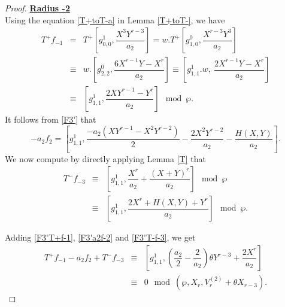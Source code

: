 \documentclass[11pt, reqno]{amsart}
\numberwithin{equation}{section}
\theoremstyle{definition}
\theoremstyle{remark}
\theoremstyle{definition}
\theoremstyle{remark}
\theoremstyle{remark}
\begin{document}
\begin{proof}
 
\noindent\underline{\textbf{Radius -2}}\\ 
Using the equation \eqref{T+toT-a} in Lemma \ref{T+toT-}, we have
\begin{eqnarray}
T^{+}f_{-1} &=& T^{+}\left[g_{0,0}^{1}, \dfrac{X^{3}Y^{r-3}}{a_{2}}\right] =  w.T^{+}\left[g_{1,0}^{0}, \dfrac{X^{r-3}Y^{3}}{a_{2}}\right] \nonumber\\
&\equiv& w.\left[g_{2,2}^{0}, \dfrac{6X^{r-1}Y-X^{r}}{a_{2}}\right]\equiv \left[g_{1,1}^{1}.w,\:\dfrac{2X^{r-1}Y-X^{r}}{a_{2}}\right] \nonumber\\
&\equiv& \left[g_{1,1}^{1}, \dfrac{2XY^{r-1}-Y^{r}}{a_{2}}\right] \mod\wp.\label{F3'T+f-1}
\end{eqnarray}
It follows from \eqref{F3'} that
\begin{equation}\label{F3'a2f-2}
    -a_{2}f_{2} = \left[g_{1,1}^{1},  \dfrac{-a_{2}(XY^{r-1}-X^{2}Y^{r-2})}{2}-\dfrac{2X^{2}Y^{r-2}}{a_{2}}-\dfrac{H(X,Y)}{a_{2}}\right].
\end{equation}
We now compute  by directly applying Lemma \ref{T} that 
\begin{eqnarray}
    T^{-}f_{-3} &\equiv &\left[g_{1,1}^{1}, \dfrac{X^{r}}{a_{2}} + \dfrac{(X+Y)^{r}}{a_{2}}\right] \mod\wp \nonumber\\
    &\equiv & \left[g_{1,1}^{1}, \dfrac{2X^{r}+ H(X,Y)+ Y^{r}}{a_{2}}\right] \mod \wp.  \label{F3'T-f-3}
\end{eqnarray}



Adding \eqref{F3'T+f-1}, \eqref{F3'a2f-2} and \eqref{F3'T-f-3}, we get 
\begin{eqnarray*}
     T^{+}f_{-1} - a_{2}f_{2} + T^{-}f_{-3} &\equiv& \left[g_{1,1}^{1}, \left(\dfrac{a_{2}}{2}-\dfrac{2}{a_2}\right)\theta Y^{r-3} + \dfrac{2X^{r}}{a_{2}}\right] \\
    &\equiv & 0\mod (\wp, X_{r},V_{r}^{(2)}+\theta X_{r-3}).
\end{eqnarray*}


\end{proof}
\end{document}
